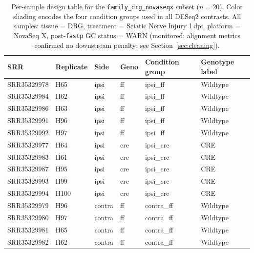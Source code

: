 \documentclass[12pt]{article}
\begin{document}
\begin{table}[H]
\centering
\small
\caption{Per-sample design table for the \texttt{family\_drg\_novaseqx} subset
  ($n = 20$). Color shading encodes the four condition groups used in all DESeq2 contrasts.
  All samples: tissue = DRG, treatment = Sciatic Nerve Injury 1\,dpi, platform = NovaSeq X,
  post-\texttt{fastp} GC status = WARN (monitored; alignment metrics confirmed no downstream
  penalty; see Section~\ref{sec:cleaning}).}
\label{tab:design_table}
\begin{tabularx}{\textwidth}{l l >{\centering\arraybackslash}p{1.6cm}
                              >{\centering\arraybackslash}p{1.6cm}
                              >{\centering\arraybackslash}p{2.2cm} Y}
\toprule
{}
\textbf{SRR} & \textbf{Replicate} & \textbf{Side} & \textbf{Geno} &
\textbf{Condition group} & \textbf{Genotype label} \\
\midrule
{}
SRR35329978 & H65  & ipsi  & ff  & ipsi\_ff  & Wildtype \\
SRR35329984 & H62  & ipsi  & ff  & ipsi\_ff  & Wildtype \\
SRR35329986 & H63  & ipsi  & ff  & ipsi\_ff  & Wildtype \\
SRR35329991 & H96  & ipsi  & ff  & ipsi\_ff  & Wildtype \\
SRR35329992 & H97  & ipsi  & ff  & ipsi\_ff  & Wildtype \\
\midrule
{}
SRR35329977 & H64  & ipsi  & cre & ipsi\_cre & CRE \\
SRR35329983 & H61  & ipsi  & cre & ipsi\_cre & CRE \\
SRR35329987 & H95  & ipsi  & cre & ipsi\_cre & CRE \\
SRR35329993 & H99  & ipsi  & cre & ipsi\_cre & CRE \\
SRR35329994 & H100 & ipsi  & cre & ipsi\_cre & CRE \\
\midrule
{}
SRR35329979 & H96  & contra & ff  & contra\_ff & Wildtype \\
SRR35329980 & H97  & contra & ff  & contra\_ff & Wildtype \\
SRR35329981 & H65  & contra & ff  & contra\_ff & Wildtype \\
SRR35329982 & H62  & contra & ff  & contra\_ff & Wildtype \\

\end{tabularx}
\end{table}
\end{document}
